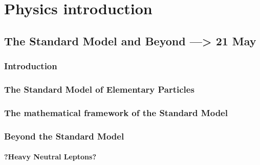 \part{Physics introduction}
\chapter{The Standard Model and Beyond  --->  21 May} %

\label{Chapter1} %


\section{Introduction}

\section{The Standard Model of Elementary Particles}
\section{The mathematical framework of the Standard Model}

\clearpage

\section{Beyond the Standard Model}
\subsection{?Heavy Neutral Leptons?}
